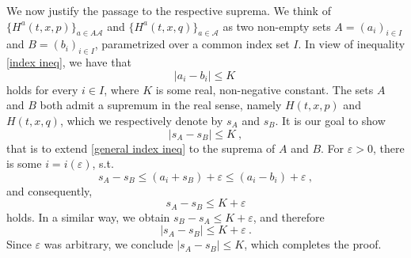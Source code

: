 We now justify the passage to the respective suprema. We think of $ \{H^a(t, x, p)\}_{a \in A
\mathcal{A}} $ and $ \{H^{a}(t, x, q)\}_{a \in \mathcal{A}} $ as two non-empty sets $ A = (a_i)_{i \in I} $ and $ B = (b_i)_{i \in I} $, parametrized over a common index set $ I $. In view of inequality \eqref{index ineq}, we have that
\begin{equation}
	\label{general index ineq}
	\lvert a_i  - b_i \rvert \leq K \ 
\end{equation}
holds for every $ i \in I $, where $ K $ is some real, non-negative constant. The sets $ A $ and $ B $ both admit a supremum in the real sense, namely $ H(t, x, p) $ and $ H(t, x, q) $, which we respectively denote by
$ s_A $ and $ s_B $. It is our goal to show
\begin{equation*}
\lvert s_A - s_B \rvert \leq K \ ,
\end{equation*}
that is to extend \ref{general index ineq} to the suprema of $ A $ and $ B $. For $ \varepsilon > 0 $, there is some $ i = i(\varepsilon) $, s.t.
\begin{equation*}
	s_A - s_B \leq (a_i + s_B) + \varepsilon \leq (a_i - b_i) + \varepsilon \ ,
\end{equation*}
and consequently,
\begin{equation*}
	s_A - s_B \leq K + \varepsilon 
\end{equation*}
holds. In a similar way, we obtain $ s_B - s_A \leq K + \varepsilon $, and therefore 
\begin{equation*}
	\lvert s_A - s_B \rvert \leq K + \varepsilon \ .
\end{equation*}
Since $ \varepsilon $ was arbitrary, we conclude $ \lvert s_A - s_B \rvert \leq K $, which completes the proof.